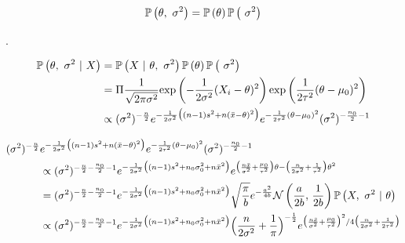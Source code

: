 \documentclass[12pt]{article}
\begin{document}
\begin{enumerate}


\[
    \mathbb{P}\left(\theta,~\sigma^2\right) = \mathbb{P}\left(\theta\right)\mathbb{P}\left(~\sigma^2\right) 
\]

.

\begin{align*}
    \mathbb{P}\left(\theta,~\sigma^2~|~X\right) 
    &= \mathbb{P}\left(X~|~\theta,~\sigma^2\right)\mathbb{P}\left(\theta\right)\mathbb{P}\left(~\sigma^2\right)\\
    &= \Pi \frac{1}{\sqrt{2\pi\sigma^2}}\mathrm{exp}\left(-\frac{1}{2\sigma^2}(X_i - \theta)^2\right) \mathrm{exp}\left(\frac{1}{2\tau^2}(\theta - \mu_0)^2\right)\\
    &\propto (\sigma^2)^{-\frac{n}{2}} 
    e^{-\frac{1}{2\sigma^2}\big((n-1)s^2 + n(\bar{x}-\theta)^2\big)} e^{-\frac{1}{2\tau^2}(\theta-\mu_0)^2}
    (\sigma^2)^{-\frac{n_0}{2}-1} 
\end{align*}


\begin{align*}
    (\sigma^2)^{-\frac{n}{2}} &
    e^{-\frac{1}{2\sigma^2}\big((n-1)s^2 + n(\bar{x}-\theta)^2\big)} e^{-\frac{1}{2\tau^2}(\theta-\mu_0)^2}
    (\sigma^2)^{-\frac{n_0}{2}-1}\\
    &\propto (\sigma^2)^{-\frac{n}{2}-\frac{n_0}{2}-1} 
    e^{-\frac{1}{2\sigma^2}\big((n-1)s^2 + n_0\sigma^2_0 + n\bar{x}^2\big)}
    e^{\big(\frac{n\bar{x}}{\sigma^2} + \frac{\mu_0}{\tau^2}\big)\theta - \big( \frac{n}{2\sigma^2} + \frac{1}{\tau^2}\big)\theta^2}\\
    &= (\sigma^2)^{-\frac{n}{2}-\frac{n_0}{2}-1} 
    e^{-\frac{1}{2\sigma^2}\big((n-1)s^2 + n_0\sigma^2_0 + n\bar{x}^2\big)}
    \sqrt{\frac{\pi}{b}}e^{-\frac{a^2}{4b}} \mathcal{N}\left(\frac{a}{2b},\,\frac{1}{2b}\right)
    \mathbb{P}\left(X,~\sigma^2~|~\theta\right) \\
    &\propto (\sigma^2)^{-\frac{n}{2}-\frac{n_0}{2}-1} 
    e^{-\frac{1}{2\sigma^2}\big((n-1)s^2 + n_0\sigma^2_0 + n\bar{x}^2\big)}\Big( \frac{n}{2\sigma^2} + \frac{1}{\pi}\Big)^{-\frac{1}{2}}
    e^{\big(\frac{n\bar{x}}{\sigma^2} + \frac{\mu_0}{\tau^2}\big)^2 / 4\big( \frac{n}{2\sigma^2} + \frac{1}{2\tau^2}\big)}\\
\end{align*}


\end{enumerate}
\end{document}
